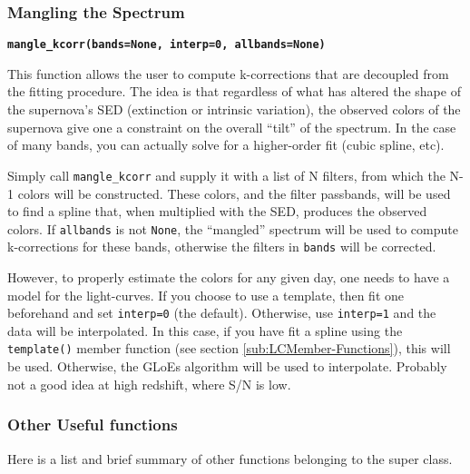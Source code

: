\documentclass[12pt]{article}
\begin{document}
\subsubsection{Mangling the Spectrum}

\texttt{\textbf{mangle\_kcorr(bands=None, interp=0, allbands=None)}}

This function allows the user to compute k-corrections that are decoupled
from the fitting procedure. The idea is that regardless of what has
altered the shape of the supernova's SED (extinction or intrinsic
variation), the observed colors of the supernova give one a constraint
on the overall {}``tilt'' of the spectrum. In the case of many bands,
you can actually solve for a higher-order fit (cubic spline, etc). 

Simply call \texttt{mangle\_kcorr} and supply it with a list of N
filters, from which the N-1 colors will be constructed. These colors,
and the filter passbands, will be used to find a spline that, when
multiplied with the SED, produces the observed colors. If \texttt{allbands}
is not \texttt{None}, the {}``mangled'' spectrum will be used to
compute k-corrections for these bands, otherwise the filters in \texttt{bands}
will be corrected.

However, to properly estimate the colors for any given day, one needs
to have a model for the light-curves. If you choose to use a template,
then fit one beforehand and set \texttt{interp=0} (the default). Otherwise,
use \texttt{interp=1} and the data will be interpolated. In this case,
if you have fit a spline using the \texttt{template()} member function
(see section \ref{sub:LCMember-Functions}), this will be used. Otherwise,
the GLoEs algorithm will be used to interpolate. Probably not a good
idea at high redshift, where S/N is low.


\subsubsection{Other Useful functions}

Here is a list and brief summary of other functions belonging to the
super class.
\end{document}
